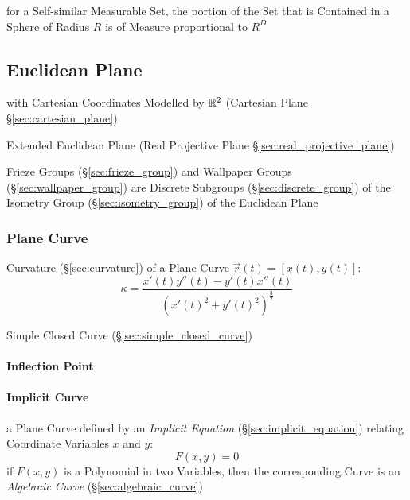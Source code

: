 for a Self-similar Measurable Set, the portion of the Set that is Contained in a
Sphere of Radius $R$ is of Measure proportional to $R^D$




\subsection{Euclidean Plane}\label{sec:euclidean_plane}

with Cartesian Coordinates Modelled by $\mathbb{R}^2$ (Cartesian Plane
\S\ref{sec:cartesian_plane})

\fist Extended Euclidean Plane (Real Projective Plane
\S\ref{sec:real_projective_plane})

Frieze Groups (\S\ref{sec:frieze_group}) and Wallpaper Groups
(\S\ref{sec:wallpaper_group}) are Discrete Subgroups
(\S\ref{sec:discrete_group}) of the Isometry Group (\S\ref{sec:isometry_group})
of the Euclidean Plane



\subsubsection{Plane Curve}\label{sec:plane_curve}

Curvature (\S\ref{sec:curvature}) of a Plane Curve $\vec{r}(t) = [x(t),y(t)]$:
\[
  \kappa = \frac{x'(t)y''(t) - y'(t)x''(t)} {(x'(t)^2 + y'(t)^2)^{\frac{3}{2}}}
\]

\fist Simple Closed Curve (\S\ref{sec:simple_closed_curve})



\paragraph{Inflection Point}\label{sec:inflection_point}\hfill

\paragraph{Implicit Curve}\label{sec:implicit_curve}\hfill

a Plane Curve defined by an \emph{Implicit Equation}
(\S\ref{sec:implicit_equation}) relating Coordinate Variables $x$ and $y$:
\[
  F(x,y) = 0
\]
if $F(x,y)$ is a Polynomial in two Variables, then the corresponding Curve is an
\emph{Algebraic Curve} (\S\ref{sec:algebraic_curve})

